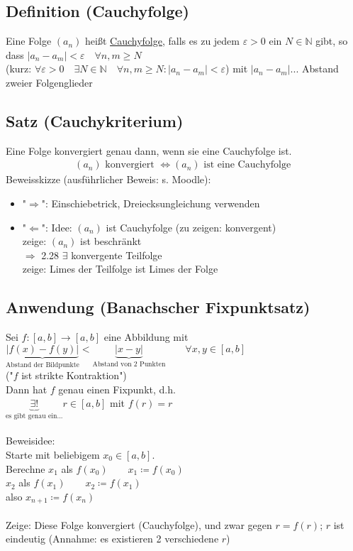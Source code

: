 \documentclass[12pt, titlepage]{article}
\newcommand{\N}{\mathds{N}}
\renewcommand{\*}{\cdot}
\renewcommand{\epsilon}{\varepsilon}
\begin{document}
	\subsection{Definition (Cauchyfolge)}
	Eine Folge $(a_n)$ heißt \underline{Cauchyfolge}, falls es zu jedem $\epsilon>0$ ein $N\in\N$ gibt, so dass $|a_n-a_m|<\epsilon\quad\forall n,m\geq N$\\
	(kurz: $\forall\epsilon>0\quad\exists N\in\N\quad\forall n,m\geq N\colon|a_n-a_m|<\epsilon$) mit $|a_n-a_m|$... Abstand zweier Folgenglieder
	\subsection{Satz (Cauchykriterium)}
	Eine Folge konvergiert genau dann, wenn sie eine Cauchyfolge ist.
	\begin{align*}
		(a_n)\textrm{ konvergiert }\Leftrightarrow(a_n)\textrm{ ist eine Cauchyfolge }
	\end{align*}
	Beweisskizze (ausführlicher Beweis: s. Moodle):
	\begin{itemize}
		\item "$\Rightarrow$": Einschiebetrick, Dreiecksungleichung verwenden
		\item "$\Leftarrow$": Idee: $(a_n)$ ist Cauchyfolge (zu zeigen: konvergent)\\
		zeige: $(a_n)$ ist beschränkt\\
		$\Rightarrow$ 2.28 $\exists$ konvergente Teilfolge\\
		zeige: Limes der Teilfolge ist Limes der Folge
	\end{itemize}
	\subsection{Anwendung (Banachscher Fixpunktsatz)}
	Sei $f\colon[a,b]\rightarrow[a,b]$ eine Abbildung mit\\
	$\underbrace{|f(x)-f(y)|}_{\textrm{Abstand der Bildpunkte}}<\underbrace{|x-y|}_{\textrm{Abstand von 2 Punkten}}\qquad\forall x,y\in[a,b]$\\
	("$f$ ist strikte Kontraktion")\\
	Dann hat $f$ genau einen Fixpunkt, d.h.\\
	$\underbrace{\exists!}_{\textrm{es gibt genau ein...}}r\in[a,b]$ mit $f(r)=r$\\
	\\
	Beweisidee:\\
	Starte mit beliebigem $x_0\in[a,b]$.\\
	Berechne $x_1$ als $f(x_0)\qquad x_1\coloneqq f(x_0)$\\
	$x_2$ als $f(x_1)\qquad x_2\coloneqq f(x_1)$\\
	also $x_{n+1}\coloneqq f(x_n)$\\
	\\
	Zeige: Diese Folge konvergiert (Cauchyfolge), und zwar gegen $r=f(r)$; $r$ ist eindeutig (Annahme: es existieren 2 verschiedene $r$)
	\newpage
\end{document}
